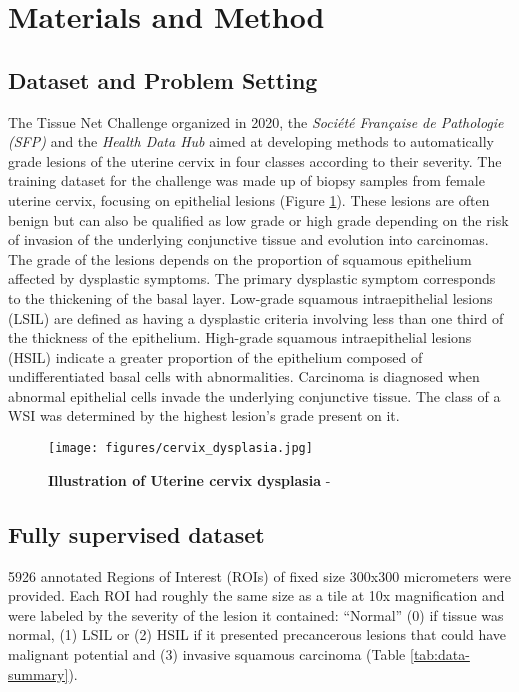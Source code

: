 \section{Materials and Method}

\subsection{Dataset and Problem Setting}

The Tissue Net Challenge \citep{drivendata_tissuenet_nodate} organized in 2020, the \textit{Soci\'et\'e Française de Pathologie (SFP)} and the \textit{Health Data Hub} aimed at developing methods to automatically grade lesions of the uterine cervix in four classes according to their severity. 
​​The training dataset for the challenge was made up of biopsy samples from female uterine cervix, focusing on epithelial lesions (Figure \ref{fig:uterine_cervix}). These lesions are often benign but can also be qualified as low grade or high grade depending on the risk of invasion of the underlying conjunctive tissue and evolution into carcinomas. The grade of the lesions depends on the proportion of squamous epithelium affected by dysplastic symptoms. The primary dysplastic symptom corresponds to the thickening of the basal layer. Low-grade squamous intraepithelial lesions (LSIL) are defined as having a dysplastic criteria involving less than one third of the thickness of the epithelium. High-grade squamous intraepithelial lesions (HSIL) indicate a greater proportion of the epithelium composed of undifferentiated basal cells with abnormalities. Carcinoma is diagnosed when abnormal epithelial cells invade the underlying conjunctive tissue. The class of a WSI was determined by the highest lesion's grade present on it.

\begin{figure}[!b]
\centering
\texttt{[image: figures/cervix\_dysplasia.jpg]}
\caption{\textbf{Illustration of Uterine cervix dysplasia} - \citep{national_cancer_institute_definition_2011} }
\label{fig:uterine_cervix}
\end{figure}

\subsection{Fully supervised dataset}

5926 annotated Regions of Interest (ROIs) of fixed size 300x300 micrometers were provided. Each ROI had roughly the same size as a tile at 10x magnification and were labeled by the severity of the lesion it contained: “Normal” (0) if tissue was normal, (1) LSIL or (2) HSIL if it presented precancerous lesions that could have malignant potential and (3) invasive squamous carcinoma (Table \ref{tab:data-summary}).


